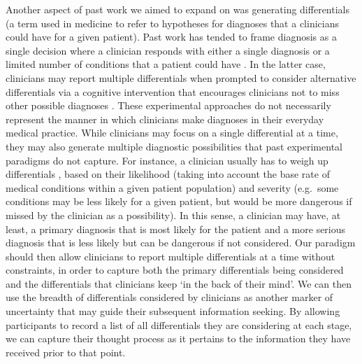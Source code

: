 \documentclass[a4paper, nobind]{templates/ociamthesis}
\begin{document}
\hfill\break
Another aspect of past work we aimed to expand on was generating differentials (a term used in medicine to refer to hypotheses for diagnoses that a clinicians could have for a given patient). Past work has tended to frame diagnosis as a single decision where a clinician responds with either a single diagnosis \autocite{redelmeier_fallacy_2023} or a limited number of conditions that a patient could have \autocite{meyer_physicians_2013}. In the latter case, clinicians may report multiple differentials when prompted to consider alternative differentials via a cognitive intervention that encourages clinicians not to miss other possible diagnoses \autocite{feyzi-behnagh_metacognitive_2014}. These experimental approaches do not necessarily represent the manner in which clinicians make diagnoses in their everyday medical practice. While clinicians may focus on a single differential at a time, they may also generate multiple diagnostic possibilities that past experimental paradigms do not capture. For instance, a clinician usually has to weigh up differentials \autocite{schiff_diagnostic_2009}, based on their likelihood (taking into account the base rate of medical conditions within a given patient population) and severity (e.g.~some conditions may be less likely for a given patient, but would be more dangerous if missed by the clinician as a possibility). In this sense, a clinician may have, at least, a primary diagnosis that is most likely for the patient and a more serious diagnosis that is less likely but can be dangerous if not considered. Our paradigm should then allow clinicians to report multiple differentials at a time without constraints, in order to capture both the primary differentials being considered and the differentials that clinicians keep `in the back of their mind'. We can then use the breadth of differentials considered by clinicians as another marker of uncertainty that may guide their subsequent information seeking. By allowing participants to record a list of all differentials they are considering at each stage, we can capture their thought process as it pertains to the information they have received prior to that point.
\end{document}
